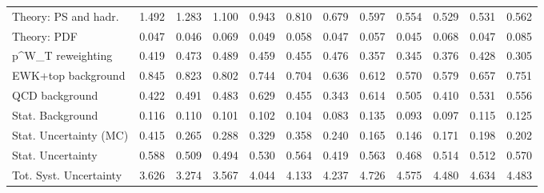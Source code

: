 \begin{tabular}{l|p{0.6cm}p{0.6cm}p{0.6cm}p{0.6cm}p{0.6cm}p{0.6cm}p{0.6cm}p{0.6cm}p{0.6cm}p{0.6cm}p{0.6cm}}
Theory: PS and hadr.                     & 1.492 & 1.283 & 1.100 & 0.943 & 0.810 & 0.679 & 0.597 & 0.554 & 0.529 & 0.531 & 0.562 \\
Theory: PDF                              & 0.047 & 0.046 & 0.069 & 0.049 & 0.058 & 0.047 & 0.057 & 0.045 & 0.068 & 0.047 & 0.085 \\
p^{W}_{T} reweighting                    & 0.419 & 0.473 & 0.489 & 0.459 & 0.455 & 0.476 & 0.357 & 0.345 & 0.376 & 0.428 & 0.305 \\
EWK+top background                       & 0.845 & 0.823 & 0.802 & 0.744 & 0.704 & 0.636 & 0.612 & 0.570 & 0.579 & 0.657 & 0.751 \\
QCD background                           & 0.422 & 0.491 & 0.483 & 0.629 & 0.455 & 0.343 & 0.614 & 0.505 & 0.410 & 0.531 & 0.556 \\
Stat. Background                         & 0.116 & 0.110 & 0.101 & 0.102 & 0.104 & 0.083 & 0.135 & 0.093 & 0.097 & 0.115 & 0.125 \\
Stat. Uncertainty (MC)                   & 0.415 & 0.265 & 0.288 & 0.329 & 0.358 & 0.240 & 0.165 & 0.146 & 0.171 & 0.198 & 0.202 \\
\hline
Stat. Uncertainty                        & 0.588 & 0.509 & 0.494 & 0.530 & 0.564 & 0.419 & 0.563 & 0.468 & 0.514 & 0.512 & 0.570 \\
\hline
Tot. Syst. Uncertainty                   & 3.626 & 3.274 & 3.567 & 4.044 & 4.133 & 4.237 & 4.726 & 4.575 & 4.480 & 4.634 & 4.483 \\
\hline
\end{tabular}
